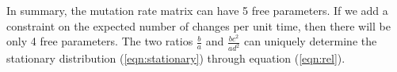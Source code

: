 \documentclass[11pt]{article}
\begin{document}
In summary, the mutation rate matrix can have 5 free parameters. If we
add a constraint on the expected number of changes per unit time, then
there will be only 4 free parameters. The two ratios $\frac{b}{a}$ and
$\frac{bc^2}{ad^2}$ can uniquely determine the stationary distribution
(\ref{eqn:stationary}) through equation (\ref{eqn:rel}).


\end{document}
